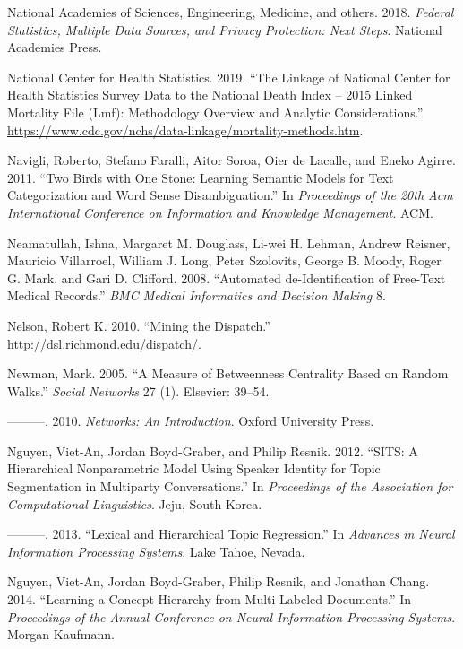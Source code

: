 \documentclass[]{krantz}
\begin{document}
\hypertarget{ref-national2018federal}{}
National Academies of Sciences, Engineering, Medicine, and others. 2018.
\emph{Federal Statistics, Multiple Data Sources, and Privacy Protection:
Next Steps}. National Academies Press.

\hypertarget{ref-NCHS2019}{}
National Center for Health Statistics. 2019. ``The Linkage of National
Center for Health Statistics Survey Data to the National Death Index --
2015 Linked Mortality File (Lmf): Methodology Overview and Analytic
Considerations.''
\url{https://www.cdc.gov/nchs/data-linkage/mortality-methods.htm}.

\hypertarget{ref-navigli-11}{}
Navigli, Roberto, Stefano Faralli, Aitor Soroa, Oier de Lacalle, and
Eneko Agirre. 2011. ``Two Birds with One Stone: Learning Semantic Models
for Text Categorization and Word Sense Disambiguation.'' In
\emph{Proceedings of the 20th Acm International Conference on
Information and Knowledge Management}. ACM.

\hypertarget{ref-Neamatullah2008}{}
Neamatullah, Ishna, Margaret M. Douglass, Li-wei H. Lehman, Andrew
Reisner, Mauricio Villarroel, William J. Long, Peter Szolovits, George
B. Moody, Roger G. Mark, and Gari D. Clifford. 2008. ``Automated
de-Identification of Free-Text Medical Records.'' \emph{BMC Medical
Informatics and Decision Making} 8.

\hypertarget{ref-nelson-10}{}
Nelson, Robert K. 2010. ``Mining the Dispatch.''
\url{http://dsl.richmond.edu/dispatch/}.

\hypertarget{ref-newman2005measure}{}
Newman, Mark. 2005. ``A Measure of Betweenness Centrality Based on
Random Walks.'' \emph{Social Networks} 27 (1). Elsevier: 39--54.

\hypertarget{ref-newman2010networks}{}
---------. 2010. \emph{Networks: An Introduction}. Oxford University
Press.

\hypertarget{ref-nguyen-12}{}
Nguyen, Viet-An, Jordan Boyd-Graber, and Philip Resnik. 2012. ``SITS: A
Hierarchical Nonparametric Model Using Speaker Identity for Topic
Segmentation in Multiparty Conversations.'' In \emph{Proceedings of the
Association for Computational Linguistics}. Jeju, South Korea.

\hypertarget{ref-nguyen-13:shlda}{}
---------. 2013. ``Lexical and Hierarchical Topic Regression.'' In
\emph{Advances in Neural Information Processing Systems}. Lake Tahoe,
Nevada.

\hypertarget{ref-Nguyen:Boyd-Graber:Resnik:Chang-2014}{}
Nguyen, Viet-An, Jordan Boyd-Graber, Philip Resnik, and Jonathan Chang.
2014. ``Learning a Concept Hierarchy from Multi-Labeled Documents.'' In
\emph{Proceedings of the Annual Conference on Neural Information
Processing Systems}. Morgan Kaufmann.
\end{document}
